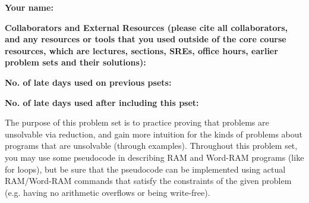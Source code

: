 \documentclass[11pt]{article}
\begin{document}

\textbf{Your name: }

\textbf{Collaborators and External Resources (please cite all collaborators, and any resources or tools that you used outside of the core course resources, which are lectures, sections, SREs, office hours, earlier problem sets and their solutions):}

\textbf{No. of late days used on previous psets: }

\textbf{No. of late days used after including this pset: }

\vspace{1em}

\noindent The purpose of this problem set is to practice proving that problems are unsolvable via reduction, and gain more intuition for the kinds of problems about programs that are unsolvable (through examples). Throughout this problem set, you may use some pseudocode in describing RAM and Word-RAM programs (like for loops), but be sure that the pseudocode can be implemented using actual RAM/Word-RAM commands that satisfy the constraints of the given problem (e.g. having no arithmetic overflows or being write-free).
\end{document}
